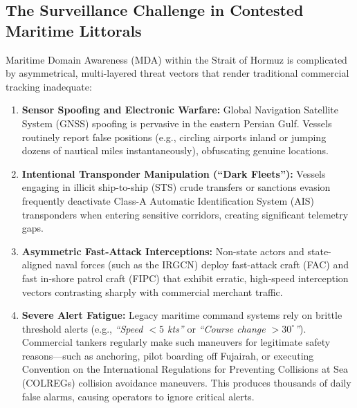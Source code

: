 \subsection{The Surveillance Challenge in Contested Maritime Littorals}
Maritime Domain Awareness (MDA) within the Strait of Hormuz is complicated by asymmetrical, multi-layered threat vectors that render traditional commercial tracking inadequate:
\begin{enumerate}[leftmargin=*]
    \item \textbf{Sensor Spoofing and Electronic Warfare:} Global Navigation Satellite System (GNSS) spoofing is pervasive in the eastern Persian Gulf. Vessels routinely report false positions (e.g., circling airports inland or jumping dozens of nautical miles instantaneously), obfuscating genuine locations.
    \item \textbf{Intentional Transponder Manipulation (``Dark Fleets''):} Vessels engaging in illicit ship-to-ship (STS) crude transfers or sanctions evasion frequently deactivate Class-A Automatic Identification System (AIS) transponders when entering sensitive corridors, creating significant telemetry gaps.
    \item \textbf{Asymmetric Fast-Attack Interceptions:} Non-state actors and state-aligned naval forces (such as the IRGCN) deploy fast-attack craft (FAC) and fast in-shore patrol craft (FIPC) that exhibit erratic, high-speed interception vectors contrasting sharply with commercial merchant traffic.
    \item \textbf{Severe Alert Fatigue:} Legacy maritime command systems rely on brittle threshold alerts (e.g., \textit{``Speed $< 5$ kts''} or \textit{``Course change $> 30^\circ$''}). Commercial tankers regularly make such maneuvers for legitimate safety reasons—such as anchoring, pilot boarding off Fujairah, or executing Convention on the International Regulations for Preventing Collisions at Sea (COLREGs) collision avoidance maneuvers. This produces thousands of daily false alarms, causing operators to ignore critical alerts.
\end{enumerate}

